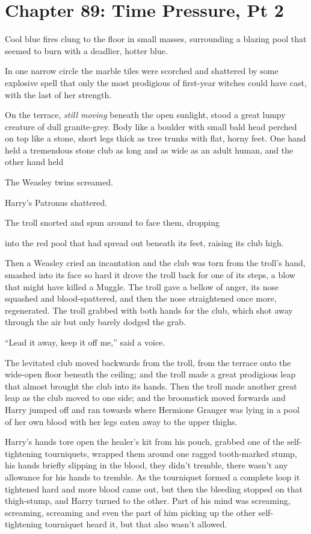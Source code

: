 \chapter{Chapter 89: Time Pressure, Pt 2}
Cool blue fires clung to the floor in small masses, surrounding a
blazing pool that seemed to burn with a deadlier, hotter blue.

In one narrow circle the marble tiles were scorched and shattered by
some explosive spell that only the most prodigious of first-year witches
could have cast, with the last of her strength.

On the terrace, \emph{still moving} beneath the open sunlight, stood a
great lumpy creature of dull granite-grey. Body like a boulder with
small bald head perched on top like a stone, short legs thick as tree
trunks with flat, horny feet. One hand held a tremendous stone club as
long and as wide as an adult human, and the other hand held

The Weasley twins screamed.

Harry's Patronus shattered.

The troll snorted and spun around to face them, dropping

into the red pool that had spread out beneath its feet, raising its club
high.

Then a Weasley cried an incantation and the club was torn from the
troll's hand, smashed into its face so hard it drove the troll back for
one of its steps, a blow that might have killed a Muggle. The troll gave
a bellow of anger, its nose squashed and blood-spattered, and then the
nose straightened once more, regenerated. The troll grabbed with both
hands for the club, which shot away through the air but only barely
dodged the grab.

``Lead it away, keep it off me,'' said a voice.

The levitated club moved backwards from the troll, from the terrace onto
the wide-open floor beneath the ceiling; and the troll made a great
prodigious leap that almost brought the club into its hands. Then the
troll made another great leap as the club moved to one side; and the
broomstick moved forwards and Harry jumped off and ran towards where
Hermione Granger was lying in a pool of her own blood with her legs
eaten away to the upper thighs.

Harry's hands tore open the healer's kit from his pouch, grabbed one of
the self-tightening tourniquets, wrapped them around one ragged
tooth-marked stump, his hands briefly slipping in the blood, they didn't
tremble, there wasn't any allowance for his hands to tremble. As the
tourniquet formed a complete loop it tightened hard and more blood came
out, but then the bleeding stopped on that thigh-stump, and Harry turned
to the other. Part of his mind was screaming, screaming, screaming and
even the part of him picking up the other self-tightening tourniquet
heard it, but that also wasn't allowed.

